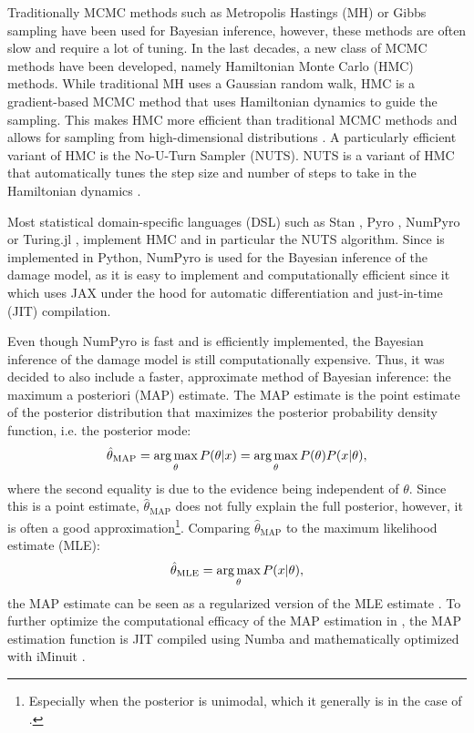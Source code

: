 Traditionally MCMC methods such as Metropolis Hastings (MH) or Gibbs sampling have been used for Bayesian inference, however, these methods are often slow and require a lot of tuning. In the last decades, a new class of MCMC methods have been developed, namely Hamiltonian Monte Carlo (HMC) methods. While traditional MH uses a Gaussian random walk, HMC is a gradient-based MCMC method that uses Hamiltonian dynamics to guide the sampling. This makes HMC more efficient than traditional MCMC methods and allows for sampling from high-dimensional distributions \autocite{betancourtConceptualIntroductionHamiltonian2018,nealMCMCUsingHamiltonian2011}. A particularly efficient variant of HMC is the No-U-Turn Sampler (NUTS). NUTS is a variant of HMC that automatically tunes the step size and number of steps to take in the Hamiltonian dynamics \autocite{homanNoUturnSamplerAdaptively2014}.

Most statistical domain-specific languages (DSL) such as Stan \autocite{carpenterStanProbabilisticProgramming2017}, Pyro \autocite{binghamPyroDeepUniversal2019}, NumPyro \autocite{phanComposableEffectsFlexible2019} or Turing.jl \autocite{geTuringLanguageFlexible2018}, implement HMC and in particular the NUTS algorithm. Since \metaDMG is implemented in Python, NumPyro is used for the Bayesian inference of the damage model, as it is easy to implement and computationally efficient since it which uses JAX \autocite{bradburyJAXComposableTransformations2018} under the hood for automatic differentiation and just-in-time (JIT) compilation.

Even though NumPyro is fast and \metaDMG is efficiently implemented, the Bayesian inference of the damage model is still computationally expensive. Thus, it was decided to also include a faster, approximate method of Bayesian inference: the maximum a posteriori (MAP) estimate. The MAP estimate is the point estimate of the posterior distribution that maximizes the posterior probability density function, i.e. the posterior mode:
\begin{align}
    \hat{\theta}_\mathrm{MAP} = \operatorname*{arg\,max}_\theta P(\theta|x) = \operatorname*{arg\,max}_\theta P(\theta)P(x|\theta),
\end{align}
where the second equality is due to the evidence being independent of $\theta$. Since this is a point estimate, $\hat{\theta}_\mathrm{MAP}$ does not fully explain the full posterior, however, it is often a good approximation\footnote{Especially when the posterior is unimodal, which it generally is in the case of \metaDMG.}. Comparing $\hat{\theta}_\mathrm{MAP}$ to the maximum likelihood estimate (MLE):
\begin{align}
    \hat{\theta}_\mathrm{MLE} = \operatorname*{arg\,max}_\theta P(x|\theta),
\end{align}
the MAP estimate can be seen as a regularized version of the MLE estimate \autocite{murphyMachineLearningProbabilistic2012}. To further optimize the computational efficacy of the MAP estimation in \metaDMG, the MAP estimation function is JIT compiled using Numba \autocite{lamNumbaLLVMbasedPython2015} and mathematically optimized with iMinuit \autocite{dembinskiScikithepIminuitV22021}.

